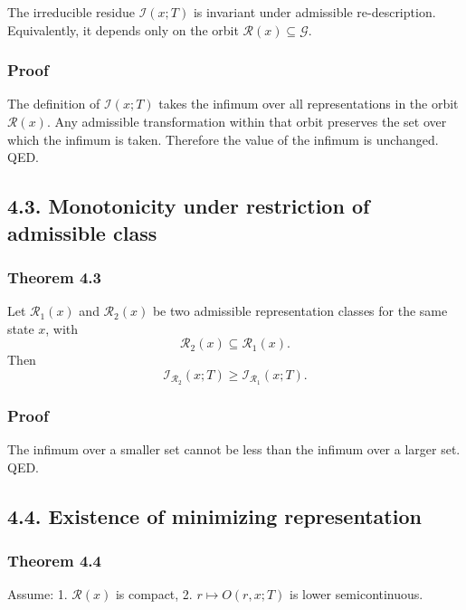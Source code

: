 \documentclass[
]{article}
\begin{document}
The irreducible residue \(\mathcal{I}(x;T)\) is invariant under
admissible re-description. Equivalently, it depends only on the orbit
\(\mathcal{R}(x) \subseteq \mathcal{G}\).

\subsubsection{Proof}\label{proof-1}

The definition of \(\mathcal{I}(x;T)\) takes the infimum over all
representations in the orbit \(\mathcal{R}(x)\). Any admissible
transformation within that orbit preserves the set over which the
infimum is taken. Therefore the value of the infimum is unchanged. QED.

\subsection{4.3. Monotonicity under restriction of admissible
class}\label{monotonicity-under-restriction-of-admissible-class}

\subsubsection{Theorem 4.3}\label{theorem-4.3}

Let \(\mathcal{R}_1(x)\) and \(\mathcal{R}_2(x)\) be two admissible
representation classes for the same state \(x\), with \[
\mathcal{R}_2(x) \subseteq \mathcal{R}_1(x).
\] Then \[
\mathcal{I}_{\mathcal{R}_2}(x;T) \ge \mathcal{I}_{\mathcal{R}_1}(x;T).
\]

\subsubsection{Proof}\label{proof-2}

The infimum over a smaller set cannot be less than the infimum over a
larger set. QED.

\subsection{4.4. Existence of minimizing
representation}\label{existence-of-minimizing-representation}

\subsubsection{Theorem 4.4}\label{theorem-4.4}

Assume: 1. \(\mathcal{R}(x)\) is compact, 2. \(r \mapsto O(r,x;T)\) is
lower semicontinuous.
\end{document}
